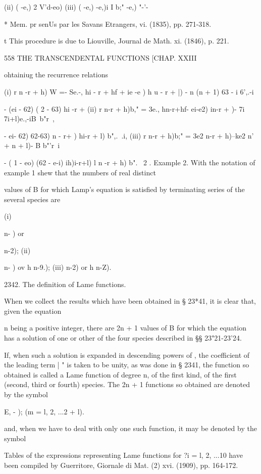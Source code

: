 {{{{(ii) ( -e,)  2 V'd-eo)  
(iii) ( -e,)   -e,)i I b;"  -e,) "-'-\ 



* Mem. pr senUs par les Savans Etrangers, vi. (1835), pp. 271-318. 

t This procedure is due to Liouville, Journal de Math. xi. (1846), p. 221. 



558 THE TRANSCENDENTAL FUNCTIONS [CHAP. XXIII 

ohtainiug the recurrence relations 

(i) r  n -r + h) W =- Se.-,  hi - r + hf + ie -e )  h u - r + |) - n (n + 1) 63 - i   6',.-i 

- (ei - 62) ( 2 - 63)  hi -r + %
(ii) r n-r + h)b," =  3e., hn-r+hf- ei-e2) in-r +  )- 7i 7i+l)e.,-iB\ b"r\ , 

-  ei- 62)  62-63)   n - r+ )  hi-r + l) b",.\ .i, 
(iii) r n-r + h)b;" =  3e2  n-r + h)--ke2 n' + n + l)- B b"'r\ i 

- ( 1 - eo) (62 - e-i) ih)i-r+l) l n -r + h) b".  \  2 . 
Example 2. With the notation of example 1 shew that the numbers of real distinct 

values of B for which Lamp's equation is satisfied by terminating series of the several 
species are 

(i) \ \ {n- )  or \ \ {n-2); (ii) \ \ {n- )  ov h n-9.); (iii)   n-2) or h n-Z). 

2342. The definition of Lame functions. 

When we collect the results which have been obtained in § 23*41, it is 
clear that, given the equation 

n being a positive integer, there are 2n + 1 values of B for which the equation 
has a solution of one or other of the four species described in §§ 23"21-23'24. 

If, when such a solution is expanded in descending powers of  , the 
coefficient of the leading term | " is taken to be unity, as was done in § 2341, 
the function so obtained is called a Lame function of degree n, of the first 
kind, of the first (second, third or fourth) species. The 2n + 1 functions so 
obtained are denoted by the symbol 

E, -  ); (m = l, 2, ...2  + l). 

and, when we have to deal with only one such function, it may be denoted by 
the symbol 

Tables of the expressions representing Lame functions for ?i = l, 2, ...10 have been 
compiled by Guerritore, Giornale di Mat. (2) xvi. (1909), pp. 164-172. 

}}}}}}}
